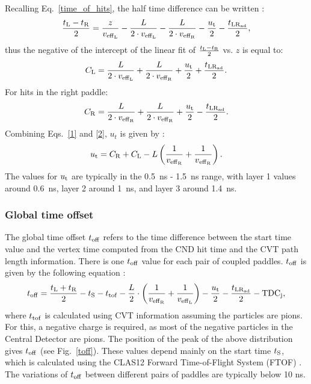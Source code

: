 Recalling Eq.~\ref{time_of_hits}, the half time difference can be written :
\begin{equation}
\frac{t_{\rm{L}}-t_{\rm{R}}}{2}=\frac{z}{v_{\rm{eff}_L}}-\frac{L}{2\cdot v_{\rm{eff}_{\rm{L}}}}-\frac{L}{2\cdot v_{\rm{eff}_{\rm{R}}}}-\frac{u_{\rm{t}}}{2}-\frac{t_{\rm{LR}_{\rm{ad}}}}{2},
\end{equation}
thus the negative of the intercept of the linear fit of $\frac{t_{\rm{L}}-t_{\rm{R}}}{2}$ vs. $z$ is equal to:
\begin{equation}
\label{1}
C_{\rm{L}}=\frac{L}{2\cdot v_{\rm{eff}_{\rm{L}}}}+\frac{L}{2\cdot v_{\rm{eff}_{\rm{R}}}}+\frac{u_{\rm{t}}}{2}+\frac{t_{\rm{LR}_{\rm{ad}}}}{2}.
\end{equation}
For hits in the right paddle:
\begin{equation}
\label{2}
C_{\rm{R}}=\frac{L}{2\cdot v_{\rm{eff}_{\rm{R}}}}+\frac{L}{2\cdot v_{\rm{eff}_{\rm{R}}}}+\frac{u_{\rm{t}}}{2}-\frac{t_{\rm{LR}_{\rm{ad}}}}{2}.
\end{equation}
Combining Eqs.~\ref{1} and \ref{2}, $u_t$ is given by :
\begin{equation}
u_{\rm{t}}=C_{\rm{R}}+C_{\rm{L}}-L \left(\frac{1}{v_{\rm{eff}_{\rm{R}}}}+\frac{1}{v{_{\rm{eff}_{\rm{R}}}}}\right).
\end{equation}
The values for $u_{\rm{t}}$ are typically in the 0.5~ns - 1.5~ns range, with layer 1 values around 0.6~ns, layer 2 around 1~ns, and layer 3 around 1.4~ns.

\subsubsection{Global time offset}

The global time offset $t_{\rm{off}}$ refers to the time difference between the start time value and the vertex time computed from the CND hit time and the CVT path length information. There is one $t_{\rm off}$ value for each pair of coupled paddles.
$t_{\rm{off}}$ is given by the following equation :
\begin{equation}
t_{\rm{off}} = \frac{t_{\rm{L}}+t_{\rm{R}}}{2} - t_{\rm{S}} - t_{\rm{tof}}
                    - \frac{L}{2} \cdot \left(\frac{1}{v_{\rm{eff}_{\rm{R}}}} + \frac{1}{v_{\rm{eff}_L}}\right) - \frac{u_{\rm{t}}}{2} - \frac{t_{\rm{LR}_{\rm{ad}}}}{2}-{\rm{TDC}}_{\rm{j}},
\end{equation}
where $t_{\rm{tof}}$ is calculated using CVT information assuming the particles are pions. For this, a negative charge is required, as most of the negative particles in the Central Detector are pions. The position of the peak of the above distribution gives $t_{\rm{off}}$ (see Fig.~\ref{toff}). These values depend mainly on the start time $t_{\rm{S}}$, which is calculated using the CLAS12 Forward Time-of-Flight System (FTOF) \cite{ftof-nim}. The variations of $t_{\rm{off}}$ between different pairs of paddles are typically below 10 ns.

